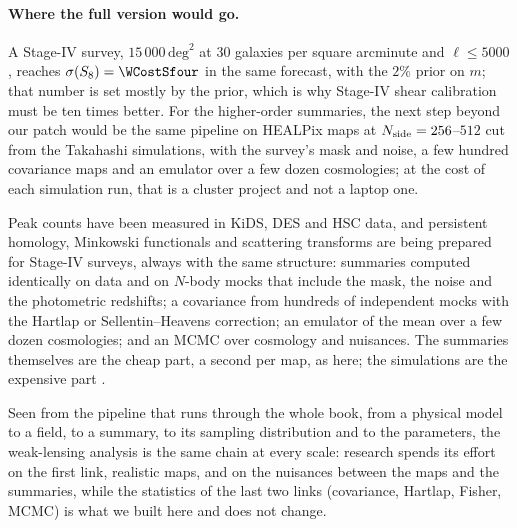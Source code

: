 \paragraph{Where the full version would go.} A Stage-IV survey, $15\,000\,\mathrm{deg}^2$ at $30$ galaxies per square
arcminute and $\ell\le5000$, reaches $\sigma(S_8)=\WCostSfour$ in the same forecast, with the $2\%$ prior on $m$; that
number is set mostly by the prior, which is why Stage-IV shear calibration must be ten times better. For the
higher-order summaries, the next step beyond our patch would be the same pipeline on HEALPix maps at
$N_{\rm side}=256$--$512$ cut from the Takahashi simulations, with the survey's mask and noise, a few hundred
covariance maps and an emulator over a few dozen cosmologies; at the cost of each simulation run, that is a cluster
project and not a laptop one.

\begin{inpractice}
Peak counts have been measured in KiDS, DES and HSC data, and persistent homology, Minkowski functionals and
scattering transforms are being prepared for Stage-IV surveys, always with the same structure: summaries computed
identically on data and on $N$-body mocks that include the mask, the noise and the photometric redshifts; a
covariance from hundreds of independent mocks with the Hartlap or Sellentin--Heavens correction; an emulator of the
mean over a few dozen cosmologies; and an MCMC over cosmology and nuisances. The summaries themselves are the cheap
part, a second per map, as here; the simulations are the expensive part \cite{Kilbinger2015,Heydenreich2021}.
\end{inpractice}

Seen from the pipeline that runs through the whole book, from a physical model to a field, to a summary, to its
sampling distribution and to the parameters, the weak-lensing analysis is the same chain at every scale: research
spends its effort on the first link, realistic maps, and on the nuisances between the maps and the summaries, while the
statistics of the last two links (covariance, Hartlap, Fisher, MCMC) is what we built here and does not change.

